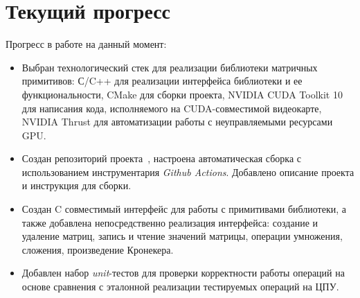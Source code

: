 \section{Текущий прогресс}

Прогресс в работе на данный момент:

\begin{itemize}
    \item Выбран технологический стек для реализации библиотеки матричных примитивов: С/C++ для реализации интерфейса библиотеки и ее функциональности, CMake для сборки проекта, NVIDIA CUDA Toolkit 10 для написания кода, исполняемого на CUDA-совместимой видеокарте, NVIDIA Thrust для автоматизации работы с неуправляемыми ресурсами GPU. 
    \item Создан репозиторий проекта~\cite{net:cubool_project}, настроена автоматическая сборка с использованием инструментария \textit{Github Actions}. Добавлено описание проекта и инструкция для сборки.
    \item Создан C совместимый интерфейс для работы с примитивами библиотеки, а также добавлена непосредственно реализация интерфейса: создание и удаление матриц, запись и чтение значений матрицы, операции умножения, сложения, произведение Кронекера.
    \item Добавлен набор \textit{unit}-тестов для проверки корректности работы операций на основе сравнения с эталонной реализации тестируемых операций на ЦПУ.
\end{itemize}